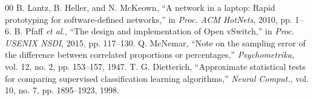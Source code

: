 \documentclass[conference]{IEEEtran}
\begin{document}
\begin{thebibliography}{00}
 B. Lantz, B. Heller, and N. McKeown, ``A network in a laptop: Rapid prototyping for software-defined networks,'' in \emph{Proc. ACM HotNets}, 2010, pp. 1--6.
 B. Pfaff \emph{et al.}, ``The design and implementation of Open vSwitch,'' in \emph{Proc. USENIX NSDI}, 2015, pp. 117--130.
 Q. McNemar, ``Note on the sampling error of the difference between correlated proportions or percentages,'' \emph{Psychometrika}, vol. 12, no. 2, pp. 153--157, 1947.
 T. G. Dietterich, ``Approximate statistical tests for comparing supervised classification learning algorithms,'' \emph{Neural Comput.}, vol. 10, no. 7, pp. 1895--1923, 1998.
\end{thebibliography}
\end{document}
